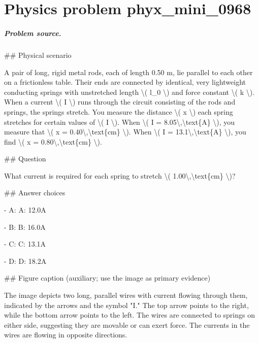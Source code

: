 
\chapter{Physics problem phyx\_mini\_0968}
\label{ch:PhyXMiniProblems_problem_phyx_mini_0968}

\paragraph{Problem source.}
\#\# Physical scenario

A pair of long, rigid metal rods, each of length 0.50 m, lie parallel to each other on a frictionless table. Their ends are connected by identical, very lightweight conducting springs with unstretched length \textbackslash{}( l\_0 \textbackslash{}) and force constant \textbackslash{}( k \textbackslash{}). When a current \textbackslash{}( I \textbackslash{}) runs through the circuit consisting of the rods and springs, the springs stretch. You measure the distance \textbackslash{}( x \textbackslash{}) each spring stretches for certain values of \textbackslash{}( I \textbackslash{}). When \textbackslash{}( I = 8.05\textbackslash{},\textbackslash{}text\{A\} \textbackslash{}), you measure that \textbackslash{}( x = 0.40\textbackslash{},\textbackslash{}text\{cm\} \textbackslash{}). When \textbackslash{}( I = 13.1\textbackslash{},\textbackslash{}text\{A\} \textbackslash{}), you find \textbackslash{}( x = 0.80\textbackslash{},\textbackslash{}text\{cm\} \textbackslash{}).

\#\# Question

What current is required for each spring to stretch \textbackslash{}( 1.00\textbackslash{},\textbackslash{}text\{cm\} \textbackslash{})?

\#\# Answer choices

- A: A: 12.0A

- B: B: 16.0A

- C: C: 13.1A

- D: D: 18.2A

\#\# Figure caption (auxiliary; use the image as primary evidence)

The image depicts two long, parallel wires with current flowing through them, indicated by the arrows and the symbol "I." The top arrow points to the right, while the bottom arrow points to the left. The wires are connected to springs on either side, suggesting they are movable or can exert force. The currents in the wires are flowing in opposite directions.

